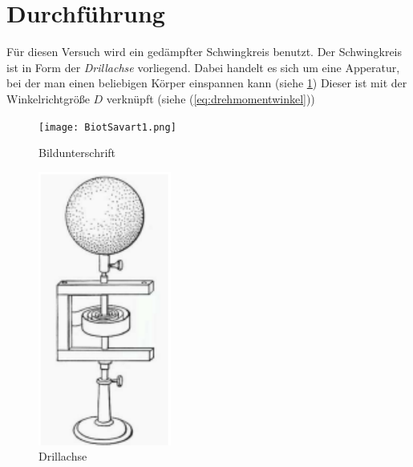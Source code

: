 \section{Durchführung}
\label{sec:Durchführung}

Für diesen Versuch wird ein gedämpfter Schwingkreis benutzt.
Der Schwingkreis ist in Form der \textit{Drillachse} vorliegend.
Dabei handelt es sich um eine Apperatur, bei der man einen beliebigen Körper einspannen kann (siehe \ref{fig:drillachse})
Dieser ist mit der Winkelrichtgröße $D$ verknüpft (siehe (\ref{eq:drehmomentwinkel}))

\begin{figure}
    \texttt{[image: BiotSavart1.png]}
    \caption{Bildunterschrift}
\end{figure}

\begin{figure}
    \label{fig:drillachse}
    \caption{Drillachse}
    \centering
    \includegraphics{pictures/Drillachse.pdf}
\end{figure}